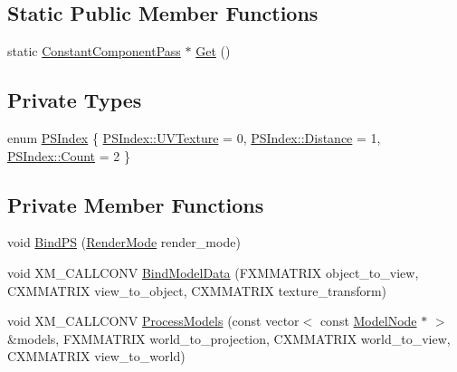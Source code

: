 \subsection*{Static Public Member Functions}
\begin{DoxyCompactItemize}
\item 
static \hyperlink{classmage_1_1_constant_component_pass}{Constant\+Component\+Pass} $\ast$ \hyperlink{classmage_1_1_constant_component_pass_ae8c8c69c9e69c4324e390833c2e3653b}{Get} ()
\end{DoxyCompactItemize}
\subsection*{Private Types}
\begin{DoxyCompactItemize}
\item 
enum \hyperlink{classmage_1_1_constant_component_pass_a5700234587f2aa0ebdb4f7790704f00b}{P\+S\+Index} \{ \hyperlink{classmage_1_1_constant_component_pass_a5700234587f2aa0ebdb4f7790704f00ba73dca3b76eca77b89c050588adba1c2b}{P\+S\+Index\+::\+U\+V\+Texture} = 0, 
\hyperlink{classmage_1_1_constant_component_pass_a5700234587f2aa0ebdb4f7790704f00ba0aa6f4210bf373c95eda00232e93cd98}{P\+S\+Index\+::\+Distance} = 1, 
\hyperlink{classmage_1_1_constant_component_pass_a5700234587f2aa0ebdb4f7790704f00bae93f994f01c537c4e2f7d8528c3eb5e9}{P\+S\+Index\+::\+Count} = 2
 \}
\end{DoxyCompactItemize}
\subsection*{Private Member Functions}
\begin{DoxyCompactItemize}
\item 
void \hyperlink{classmage_1_1_constant_component_pass_a6027d0f628ffd03618aebacb35672c6e}{Bind\+PS} (\hyperlink{namespacemage_a5e7e18b0154373ce8fc942fe3f6b27fd}{Render\+Mode} render\+\_\+mode)
\item 
void X\+M\+\_\+\+C\+A\+L\+L\+C\+O\+NV \hyperlink{classmage_1_1_constant_component_pass_a196372d184f74c8f268adc1e7865ef17}{Bind\+Model\+Data} (F\+X\+M\+M\+A\+T\+R\+IX object\+\_\+to\+\_\+view, C\+X\+M\+M\+A\+T\+R\+IX view\+\_\+to\+\_\+object, C\+X\+M\+M\+A\+T\+R\+IX texture\+\_\+transform)
\item 
void X\+M\+\_\+\+C\+A\+L\+L\+C\+O\+NV \hyperlink{classmage_1_1_constant_component_pass_a4d3b510a03f9612c73be230662470bf0}{Process\+Models} (const vector$<$ const \hyperlink{classmage_1_1_model_node}{Model\+Node} $\ast$ $>$ \&models, F\+X\+M\+M\+A\+T\+R\+IX world\+\_\+to\+\_\+projection, C\+X\+M\+M\+A\+T\+R\+IX world\+\_\+to\+\_\+view, C\+X\+M\+M\+A\+T\+R\+IX view\+\_\+to\+\_\+world)
\end{DoxyCompactItemize}
